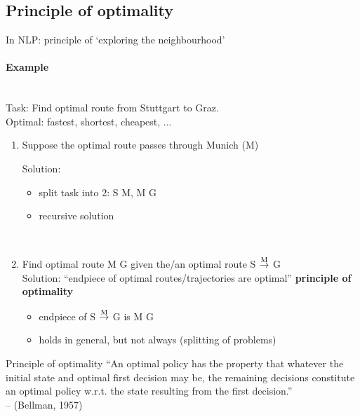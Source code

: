 \subsection{Principle of optimality}
In NLP: principle of `exploring the neighbourhood'

\paragraph{Example} ~\\
Task: Find optimal route from Stuttgart to Graz.\\
Optimal: fastest, shortest, cheapest, ...\\

\begin{enumerate}
    \item Suppose the optimal route
    passes through Munich (M)\\
    \begin{figure}[H]
    \centering
    \def\svgwidth{0.5\columnwidth}
    
    \end{figure}
    Solution:
    \begin{itemize}
        \item split task into 2:
        S \lat{} M, M \lat{} G
        \item recursive solution
    \end{itemize}~
    
    \item Find optimal route M \lat{} G
    given the/an optimal route
    S$~\overset{\textnormal{M}}{\rightarrow}~$G\\
    
    Solution: ``endpiece of optimal routes/trajectories are optimal''
    \lat{} \textbf{principle of optimality}
    \begin{itemize}
        \item endpiece of 
        S$~\overset{\textnormal{M}}{\rightarrow}~$G
        is M \lat{} G
        \item holds in general, but not always
        (splitting of problems)
    \end{itemize}
\end{enumerate}

\begin{definition}{Principle of optimality}
``An optimal policy has the property that whatever the initial state and optimal first decision may be, the remaining decisions constitute an optimal policy w.r.t. the state resulting from the first decision.''\\
-- (Bellman, 1957) 
\end{definition}


